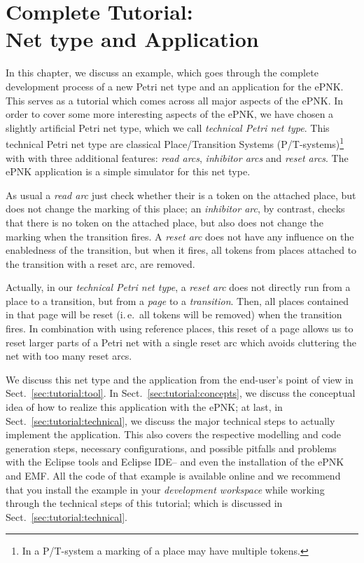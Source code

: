 \chapter[Tutorial: Net type and application] {Complete Tutorial:\\
  Net type and Application}
\label{chap:tutorial}

In this chapter, we discuss an example, which goes through the complete
development process of a new Petri net type and an application for the ePNK.
This serves as a tutorial which comes across all major aspects of the ePNK.
In order to cover some more interesting aspects of the ePNK, we have
chosen a slightly artificial Petri net type, which we call \emph{technical
Petri net type}. This technical Petri net type are classical Place/Transition
Systems (P/T-systems)\footnote
  {In a P/T-system a marking of a place may have multiple tokens.}
with with three additional features: \emph{read arcs}, \emph{inhibitor arcs}
and \emph{reset arcs}. The ePNK application is a simple simulator for this
net type.

As usual a \emph{read arc} just check whether their is a token on the attached
place, but does not change the marking of this place; an \emph{inhibitor arc},
by contrast, checks that there is no token on the attached place, but also does
not change the marking when the transition fires. A \emph{reset arc} does not
have any influence on the enabledness of the transition, but when it fires, all
tokens from places attached to the transition with a reset arc, are removed.

Actually, in our \emph{technical Petri net type}, a \emph{reset arc} does not
directly run from a place to a transition, but from a \emph{page} to a
\emph{transition}. Then, all places contained in that page will be reset
(i.\,e.\ all tokens will be removed) when the transition fires. In combination
with using reference places, this reset of a page allows us to reset larger
parts of a Petri net with a single reset arc which avoids cluttering the net
with too many reset arcs.

We discuss this net type and the application from the end-user's point of
view in Sect.~\ref{sec:tutorial:tool}. In
Sect.~\ref{sec:tutorial:concepts}, we discuss
the conceptual idea of how to realize this application with the ePNK; at last, in
Sect.~\ref{sec:tutorial:technical}, we discuss the major
technical steps to actually implement the application. This also covers
the respective modelling and code generation steps, necessary configurations,
and possible pitfalls and problems with the Eclipse tools and Eclipse IDE-- and
even the installation of the ePNK and EMF. All the code of that example is
available online and we recommend that you install the example in your
\emph{development workspace} while working through the technical steps of this
tutorial; which is discussed in Sect.~\ref{sec:tutorial:technical}.

